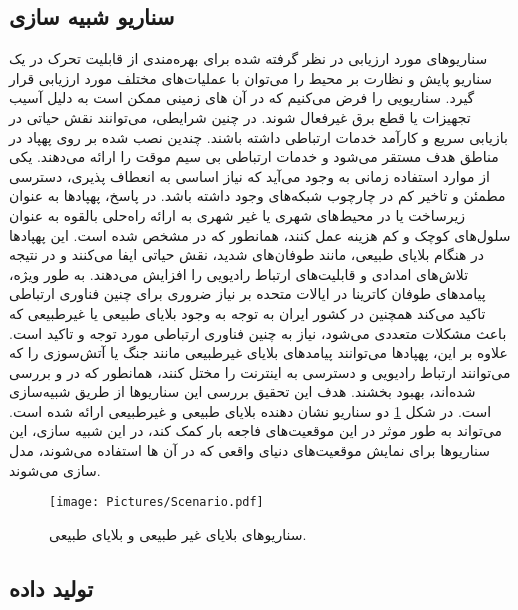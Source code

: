 \subsection{سناریو شبیه سازی}
سناریو‌های مورد ارزیابی در نظر گرفته شده برای بهره‌مندی از قابلیت تحرک در یک سناریو پایش و نظارت بر محیط را می‌توان با عملیات‌های مختلف مورد ارزیابی قرار گیرد. سناریویی را فرض می‌کنیم که در آن های زمینی ممکن است به دلیل آسیب تجهیزات یا قطع برق غیرفعال شوند. در چنین شرایطی،  می‌توانند نقش حیاتی در بازیابی سریع و کارآمد خدمات ارتباطی داشته باشند. چندین  نصب شده بر روی پهپاد در مناطق هدف مستقر می‌شود و خدمات ارتباطی بی سیم موقت را ارائه می‌دهند. یکی از موارد استفاده زمانی به وجود می‌آید که نیاز اساسی به انعطاف پذیری، دسترسی مطمئن و تاخیر کم در چارچوب شبکه‌های  وجود داشته باشد. در پاسخ، پهپادها به عنوان زیرساخت  یا  در محیط‌های شهری یا غیر شهری به ارائه راه‌حلی بالقوه به عنوان سلول‌های کوچک و کم هزینه عمل ‌کنند، همانطور که در \cite{Bajracharya2022} مشخص شده است. این پهپادها در هنگام بلایای طبیعی، مانند طوفان‌های شدید، نقش حیاتی ایفا می‌کنند و در نتیجه تلاش‌های امدادی و قابلیت‌های ارتباط رادیویی را افزایش می‌دهند. به طور ویژه، پیامدهای طوفان کاترینا در ایالات متحده بر نیاز ضروری برای چنین فناوری‌ ارتباطی تاکید می‌کند همچنین در کشور ایران به توجه به وجود بلایای طبیعی یا غیرطبیعی که باعث مشکلات متعددی می‌شود، نیاز به چنین فناوری ارتباطی مورد توجه و تاکید است. علاوه بر این، پهپادها می‌توانند پیامدهای بلایای غیرطبیعی مانند جنگ یا آتش‌سوزی را که می‌توانند ارتباط رادیویی و دسترسی به اینترنت را مختل کنند، همانطور که در \cite{Parvaresh2023} و \cite{Liao2022} بررسی شده‌اند، بهبود بخشند. هدف این تحقیق بررسی این سناریوها از طریق شبیه‌سازی است. در شکل \ref{fig:scenario2} دو سناریو نشان دهنده بلایای طبیعی و غیرطبیعی ارائه شده است.  می‌تواند به طور موثر در این موقعیت‌های فاجعه بار کمک کند، در این شبیه سازی، این سناریوها برای نمایش موقعیت‌های دنیای واقعی که در آن ها استفاده می‌شوند، مدل سازی می‌شوند.
%

\begin{figure}%
	\centering
	\texttt{[image: Pictures/Scenario.pdf]}
	\caption{سناریوهای بلایای غیر طبیعی و بلایای طبیعی.}
	\label{fig:scenario2}
\end{figure}


\subsection{تولید داده}








